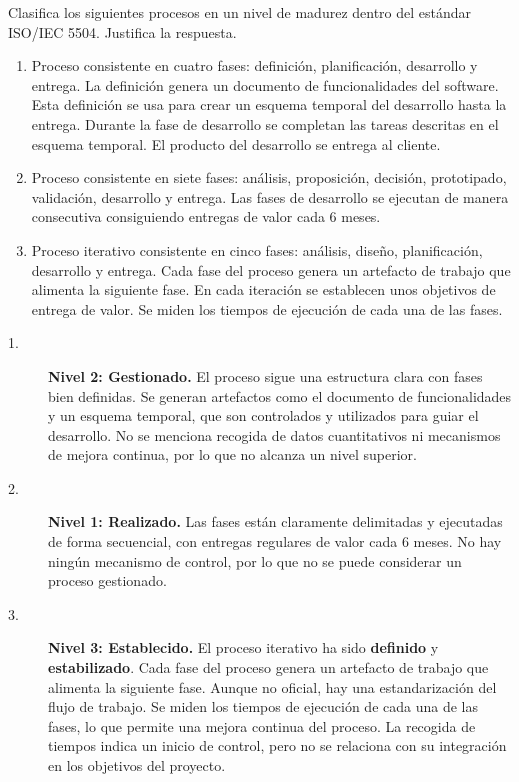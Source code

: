 

\begin{enunciado}
    Clasifica los siguientes procesos en un nivel de madurez dentro del estándar ISO/IEC 5504.
    Justifica la respuesta.
    \begin{enumerate}
        \item Proceso consistente en cuatro fases: definición, planificación, desarrollo y entrega.
        La definición genera un documento de funcionalidades del software.
        Esta definición se usa para crear un esquema temporal del desarrollo hasta la entrega.
        Durante la fase de desarrollo se completan las tareas descritas en el esquema temporal.
        El producto del desarrollo se entrega al cliente.

        \item Proceso consistente en siete fases: análisis, proposición, decisión, prototipado, validación, desarrollo y entrega.
        Las fases de desarrollo se ejecutan de manera consecutiva consiguiendo entregas de valor cada 6 meses.

        \item Proceso iterativo consistente en cinco fases: análisis, diseño, planificación, desarrollo y entrega.
        Cada fase del proceso genera un artefacto de trabajo que alimenta la siguiente fase.
        En cada iteración se establecen unos objetivos de entrega de valor.
        Se miden los tiempos de ejecución de cada una de las fases.
    \end{enumerate}
\end{enunciado}

\begin{solucion}
    \begin{description}
        \item[1.] \textbf{Nivel 2: Gestionado.}
        El proceso sigue una estructura clara con fases bien definidas.
        Se generan artefactos como el documento de funcionalidades y un esquema temporal, que son controlados y utilizados para guiar el desarrollo.
        No se menciona recogida de datos cuantitativos ni mecanismos de mejora continua, por lo que no alcanza un nivel superior.

        \item[2.] \textbf{Nivel 1: Realizado.}
        Las fases están claramente delimitadas y ejecutadas de forma secuencial, con entregas regulares de valor cada 6 meses.
        No hay ningún mecanismo de control, por lo que no se puede considerar un proceso gestionado.


        \item[3.] \textbf{Nivel 3: Establecido.}
        El proceso iterativo ha sido \textbf{definido} y \textbf{estabilizado}.
        Cada fase del proceso genera un artefacto de trabajo que alimenta la siguiente fase.
        Aunque no oficial, hay una estandarización del flujo de trabajo.
        Se miden los tiempos de ejecución de cada una de las fases, lo que permite una mejora continua del proceso.
        La recogida de tiempos indica un inicio de control, pero no se relaciona con su integración en los objetivos del proyecto.
    \end{description}
\end{solucion}
